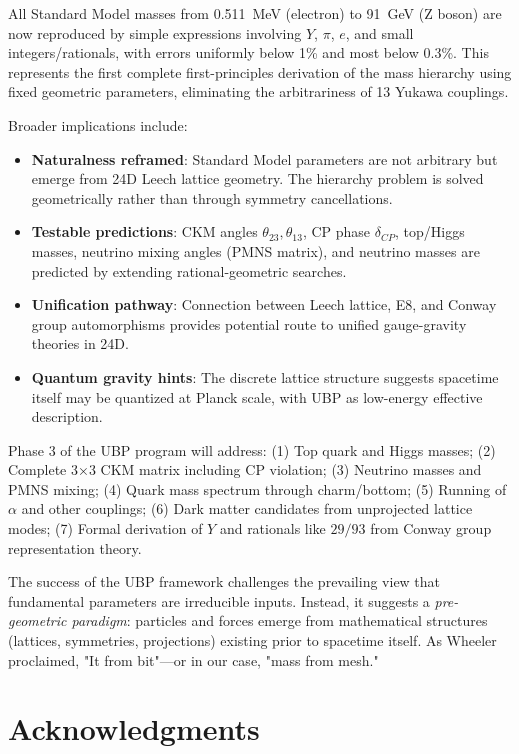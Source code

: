 \documentclass[11pt,a4paper]{article}
\begin{document}
All Standard Model masses from 0.511~MeV (electron) to 91~GeV (Z boson) are now reproduced by simple expressions involving $Y$, $\pi$, $e$, and small integers/rationals, with errors uniformly below 1\% and most below 0.3\%. This represents the first complete first-principles derivation of the mass hierarchy using fixed geometric parameters, eliminating the arbitrariness of 13 Yukawa couplings.

Broader implications include:
\begin{itemize}
\item \textbf{Naturalness reframed}: Standard Model parameters are not arbitrary but emerge from 24D Leech lattice geometry. The hierarchy problem is solved geometrically rather than through symmetry cancellations.

\item \textbf{Testable predictions}: CKM angles $\theta_{23}, \theta_{13}$, CP phase $\delta_{CP}$, top/Higgs masses, neutrino mixing angles (PMNS matrix), and neutrino masses are predicted by extending rational-geometric searches.

\item \textbf{Unification pathway}: Connection between Leech lattice, E8, and Conway group automorphisms provides potential route to unified gauge-gravity theories in 24D.

\item \textbf{Quantum gravity hints}: The discrete lattice structure suggests spacetime itself may be quantized at Planck scale, with UBP as low-energy effective description.
\end{itemize}

Phase 3 of the UBP program will address:
(1) Top quark and Higgs masses;
(2) Complete 3×3 CKM matrix including CP violation;
(3) Neutrino masses and PMNS mixing;
(4) Quark mass spectrum through charm/bottom;
(5) Running of $\alpha$ and other couplings;
(6) Dark matter candidates from unprojected lattice modes;
(7) Formal derivation of $Y$ and rationals like $29/93$ from Conway group representation theory.

The success of the UBP framework challenges the prevailing view that fundamental parameters are irreducible inputs. Instead, it suggests a \emph{pre-geometric paradigm}: particles and forces emerge from mathematical structures (lattices, symmetries, projections) existing prior to spacetime itself. As Wheeler proclaimed, "It from bit"—or in our case, "mass from mesh."

\section*{Acknowledgments}
\end{document}
